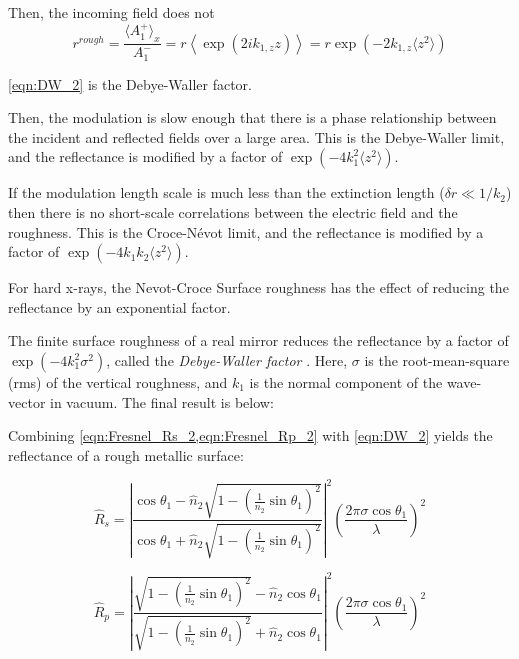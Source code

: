 Then, the incoming field does not 
\begin{equation}
r^{rough} = \frac{\langle A_1^+ \rangle_x}{A_1^-} = r \left\langle \exp \left( 2 i k_{1,z} z \right) \right\rangle = r \exp \left( -2 k_{1,z} \langle z^2 \rangle \right)
\label{eqn:DW_2}
\end{equation}

\cref{eqn:DW_2} is the Debye-Waller factor.

Then, the modulation is slow enough that there is a phase relationship between the incident and reflected fields over a large area. This is the Debye-Waller limit, and the reflectance is modified by a factor of $\exp \left( -4 k_1^2 \langle z^2 \rangle \right)$.

If the modulation length scale is much less than the extinction length ($\delta r \ll 1/k_2$) then there is no short-scale correlations between the electric field and the roughness. This is the Croce-N\'{e}vot limit, and the reflectance is modified by a factor of $\exp \left( -4 k_1 k_2 \langle z^2 \rangle \right)$.

For hard x-rays, the Nevot-Croce Surface roughness has the effect of reducing the reflectance by an exponential factor. 

The finite surface roughness of a real mirror reduces the reflectance by a factor of $\exp\left(-4 k_1^2 \sigma^2\right)$, called the \textit{Debye-Waller factor} \cite{gibaudSpecularReflectivitySmooth2009}. Here, $\sigma$ is the root-mean-square (rms) of the vertical roughness, and $k_1$ is the normal component of the wave-vector in vacuum. The final result is below:


Combining \cref{eqn:Fresnel_Rs_2,eqn:Fresnel_Rp_2} with \cref{eqn:DW_2} yields the reflectance of a rough metallic surface:

\begin{equation}
\hat{R}_s = \left| \frac{\cos \theta_1 - \hat{n}_2 \sqrt{1-\left(\frac{1}{n_2}\sin \theta_1\right)^2}}{\cos \theta_1 + \hat{n}_2 \sqrt{1-\left(\frac{1}{n_2}\sin \theta_1\right)^2}} \right|^2 \left( \frac{2 \pi \sigma \cos \theta_1}{\lambda} \right)^2
\label{eqn:Fresnel_Rs_3}
\end{equation}

\begin{equation}
\hat{R}_p = \left| \frac{\sqrt{1-\left(\frac{1}{n_2}\sin \theta_1\right)^2} - \hat{n}_2 \cos \theta_1}{\sqrt{1-\left(\frac{1}{n_2}\sin \theta_1\right)^2} + \hat{n}_2 \cos \theta_1} \right|^2 \left( \frac{2 \pi \sigma \cos \theta_1}{\lambda} \right)^2
\label{eqn:Fresnel_Rp_3}
\end{equation}



